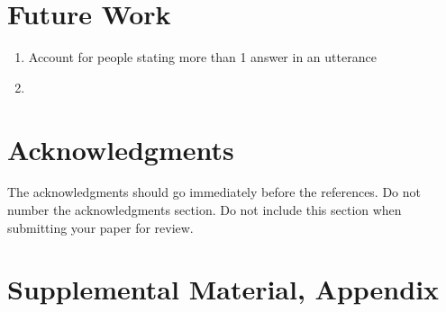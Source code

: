 \documentclass[hidelinks, 11pt]{article}
\begin{document}
\section{Future Work}
\label{sec:future_work}

\begin{enumerate}
  \item Account for people stating more than 1 answer in an utterance
  \item
\end{enumerate}



\section*{Acknowledgments}
\label{sec:acknowledgments}

The acknowledgments should go immediately before the references.  Do
not number the acknowledgments section. Do not include this section
when submitting your paper for review.

%
%



\appendix

\section{Supplemental Material, Appendix}
\label{sec:supplemental}
\end{document}
